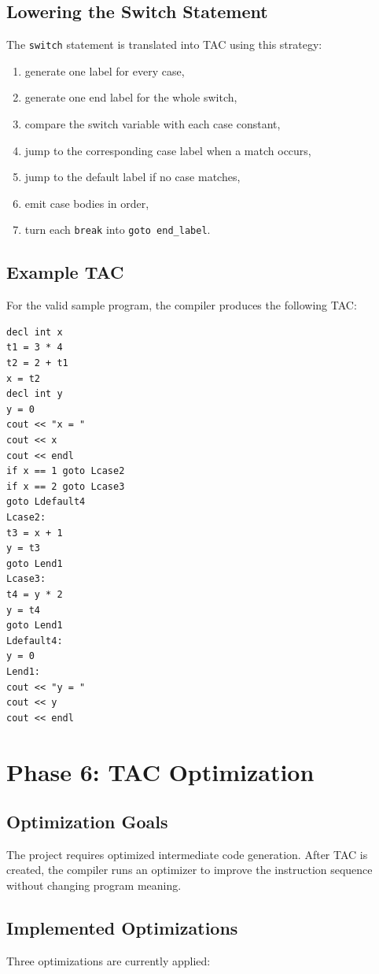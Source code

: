 \documentclass[12pt,a4paper]{article}
\begin{document}
\subsection{Lowering the Switch Statement}
The \texttt{switch} statement is translated into TAC using this strategy:

\begin{enumerate}
    \item generate one label for every case,
    \item generate one end label for the whole switch,
    \item compare the switch variable with each case constant,
    \item jump to the corresponding case label when a match occurs,
    \item jump to the default label if no case matches,
    \item emit case bodies in order,
    \item turn each \texttt{break} into \texttt{goto end\_label}.
\end{enumerate}

\subsection{Example TAC}
For the valid sample program, the compiler produces the following TAC:

\begin{lstlisting}
decl int x
t1 = 3 * 4
t2 = 2 + t1
x = t2
decl int y
y = 0
cout << "x = "
cout << x
cout << endl
if x == 1 goto Lcase2
if x == 2 goto Lcase3
goto Ldefault4
Lcase2:
t3 = x + 1
y = t3
goto Lend1
Lcase3:
t4 = y * 2
y = t4
goto Lend1
Ldefault4:
y = 0
Lend1:
cout << "y = "
cout << y
cout << endl
\end{lstlisting}

\section{Phase 6: TAC Optimization}
\subsection{Optimization Goals}
The project requires optimized intermediate code generation. After TAC is created, the compiler runs an optimizer to improve the instruction sequence without changing program meaning.

\subsection{Implemented Optimizations}
Three optimizations are currently applied:
\end{document}
